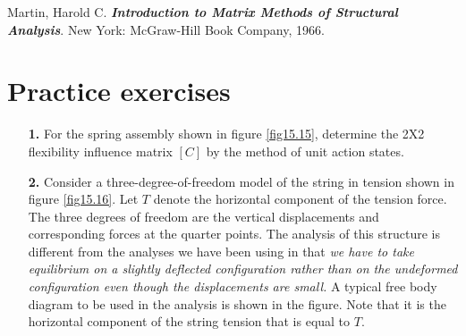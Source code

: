 \documentclass{AeroStructure-ERJohnson}
\begin{document}
\begin{thebibliography}{}\label{sec15.8}
\bibitem{}
Martin, Harold C. \textit{\textbf{Introduction to Matrix Methods of Structural Analysis}}. New York: McGraw-Hill Book Company, 1966.
\end{thebibliography}

\pagebreak


\section{Practice exercises}\label{sec15.9}

\begin{exercise}
\begin{enumerate}[\textbf{2.}]
\item[\textbf{1.}] For the spring assembly shown in figure \ref{fig15.15}, determine the 2X2 flexibility influence matrix $[C]$ by the method of unit action states.

    {\def\thefigure{15.15}
}


\item[\textbf{2.}] Consider a three-degree-of-freedom model of the string in tension shown in figure \ref{fig15.16}. Let $T$ denote the horizontal component of the tension force. The three degrees of freedom are the vertical displacements and corresponding forces at the quarter points. The analysis of this structure is different from the analyses we have been using in that \textit{we have to take equilibrium on a slightly deflected configuration rather than on the undeformed configuration even though the displacements are small.} A typical free body diagram to be used in the analysis is shown in the figure. Note that it is the horizontal component of the string tension that is equal to $T$.

 {\def\thefigure{15.16}
}


\end{enumerate}
\end{exercise}
\end{document}
